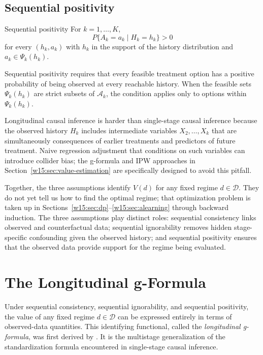 \documentclass[master.tex]{subfiles}
\begin{document}
\subsection{Sequential positivity}

\begin{defn}{Sequential positivity}
\label{w15:defn:seq-positivity}
For $k = 1,\ldots,K$,
\[
P\{A_k = a_k \mid H_k = h_k\} > 0
\]
for every $(h_k, a_k)$ with $h_k$ in the support of the history distribution and $a_k \in \Psi_k(h_k)$.
\end{defn}

Sequential positivity requires that every feasible treatment option has a positive probability of being observed at every reachable history. When the feasible sets $\Psi_k(h_k)$ are strict subsets of $\mathcal{A}_k$, the condition applies only to options within $\Psi_k(h_k)$.

\begin{remark}
Longitudinal causal inference is harder than single-stage causal inference because the observed history $H_k$ includes intermediate variables $X_2,\ldots,X_k$ that are simultaneously consequences of earlier treatments and predictors of future treatment. Naive regression adjustment that conditions on such variables can introduce collider bias; the g-formula and IPW approaches in Section~\ref{w15:sec:value-estimation} are specifically designed to avoid this pitfall.
\end{remark}

Together, the three assumptions identify $V(d)$ for any fixed regime $d \in \mathcal{D}$. They do not yet tell us how to find the optimal regime; that optimization problem is taken up in Sections~\ref{w15:sec:dp}--\ref{w15:sec:alearning} through backward induction. The three assumptions play distinct roles: sequential consistency links observed and counterfactual data; sequential ignorability removes hidden stage-specific confounding given the observed history; and sequential positivity ensures that the observed data provide support for the regime being evaluated.

\section{The Longitudinal g-Formula}
\label{w15:sec:gformula}

Under sequential consistency, sequential ignorability, and sequential positivity, the value of any fixed regime $d \in \mathcal{D}$ can be expressed entirely in terms of observed-data quantities. This identifying functional, called the \emph{longitudinal g-formula}, was first derived by \citet{robins1986new}. It is the multistage generalization of the standardization formula encountered in single-stage causal inference.
\end{document}
